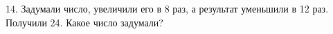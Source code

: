 14. Задумали число, увеличили его в 8 раз, а результат уменьшили в 12 раз. Получили 24. Какое число задумали?\\
